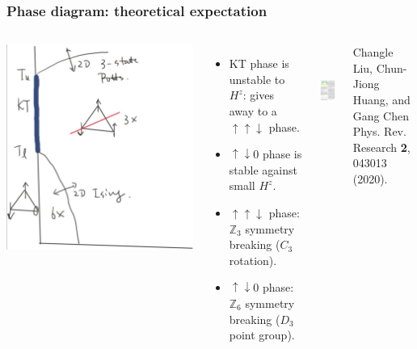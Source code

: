 \documentclass[xcolor=table, aspectratio=1610,ignorenonframetext]{beamer}
\begin{document}
\begin{frame}
  \frametitle{Phase diagram: theoretical expectation}
  \begin{columns}
    \includegraphics[width=\textwidth]{theory-pd-hz}
    \begin{itemize}
    \item KT phase is unstable to $H^z$: gives away to a $\uparrow\uparrow\downarrow$ phase.
    \item $\uparrow\downarrow0$ phase is stable against small $H^z$.
    \item $\uparrow\uparrow\downarrow$ phase: $\mathbb Z_3$ symmetry breaking ($C_3$ rotation).
    \item $\uparrow\downarrow0$ phase: $\mathbb Z_6$ symmetry breaking ($D_3$ point group).
    \end{itemize}

    \begin{center}
      \includegraphics[height=3cm]{pd-gangchen}
    \end{center}
    {\small Changle Liu, Chun-Jiong Huang, and Gang Chen\\
      Phys. Rev. Research \textbf{2}, 043013 (2020).}
  \end{columns}
\end{frame}
\end{document}
